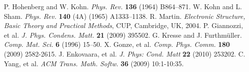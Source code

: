 \documentclass[a0,landscape]{a0poster}
\begin{document}
\begin{multicols}{3}
\begin{thebibliography}{0}
 P. Hohenberg and W. Kohn. \textit{Phys. Rev.} \textbf{136}
 (1964) B864–871.
 W. Kohn and L. Sham. \textit{Phys. Rev.} \textbf{140} (4A) (1965) A1333–1138.
 R. Martin. \textit{Electronic Structure, Basic Theory and Practical Methods}, CUP, Cambridge, UK, 2004.
 P. Giannozzi, et al. \textit{J. Phys. Condens. Matt.}
\textbf{21} (2009) 395502.
 G. Kresse and J. Furthmüller. \textit{Comp. Mat. Sci.}
\textbf{6} (1996) 15–50.
 X. Gonze, et al. \textit{Comp. Phys. Comm.} \textbf{180}
(2009) 2582-2615.
 J. Enkovaara, et al. \textit{J. Phys: Cond. Matt}
\textbf{22} (2010) 253202.
 C. Yang, et al. \textit{ACM Trans. Math. Softw.}
\textbf{36} (2009) 10:1-10:35.
\end{thebibliography}






\end{multicols}
\end{document}
